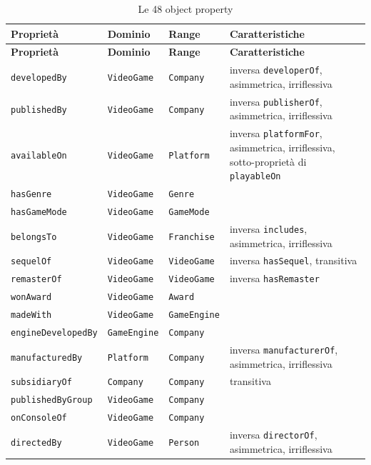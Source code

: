 \begingroup\footnotesize\begin{longtable}{lllp{6cm}}
\caption{Le 48 object property}\\ \toprule
\textbf{Proprietà} & \textbf{Dominio} & \textbf{Range} & \textbf{Caratteristiche} \\ \midrule \endfirsthead
\textbf{Proprietà} & \textbf{Dominio} & \textbf{Range} & \textbf{Caratteristiche} \\ \midrule \endhead \bottomrule \endfoot
\texttt{developedBy} & \texttt{VideoGame} & \texttt{Company} & inversa \texttt{developerOf}, asimmetrica, irriflessiva \\
\texttt{publishedBy} & \texttt{VideoGame} & \texttt{Company} & inversa \texttt{publisherOf}, asimmetrica, irriflessiva \\
\texttt{availableOn} & \texttt{VideoGame} & \texttt{Platform} & inversa \texttt{platformFor}, asimmetrica, irriflessiva, sotto-proprietà di \texttt{playableOn} \\
\texttt{hasGenre} & \texttt{VideoGame} & \texttt{Genre} &  \\
\texttt{hasGameMode} & \texttt{VideoGame} & \texttt{GameMode} &  \\
\texttt{belongsTo} & \texttt{VideoGame} & \texttt{Franchise} & inversa \texttt{includes}, asimmetrica, irriflessiva \\
\texttt{sequelOf} & \texttt{VideoGame} & \texttt{VideoGame} & inversa \texttt{hasSequel}, transitiva \\
\texttt{remasterOf} & \texttt{VideoGame} & \texttt{VideoGame} & inversa \texttt{hasRemaster} \\
\texttt{wonAward} & \texttt{VideoGame} & \texttt{Award} &  \\
\texttt{madeWith} & \texttt{VideoGame} & \texttt{GameEngine} &  \\
\texttt{engineDevelopedBy} & \texttt{GameEngine} & \texttt{Company} &  \\
\texttt{manufacturedBy} & \texttt{Platform} & \texttt{Company} & inversa \texttt{manufacturerOf}, asimmetrica, irriflessiva \\
\texttt{subsidiaryOf} & \texttt{Company} & \texttt{Company} & transitiva \\
\texttt{publishedByGroup} & \texttt{VideoGame} & \texttt{Company} &  \\
\texttt{onConsoleOf} & \texttt{VideoGame} & \texttt{Company} &  \\
\texttt{directedBy} & \texttt{VideoGame} & \texttt{Person} & inversa \texttt{directorOf}, asimmetrica, irriflessiva \\

\end{longtable}
